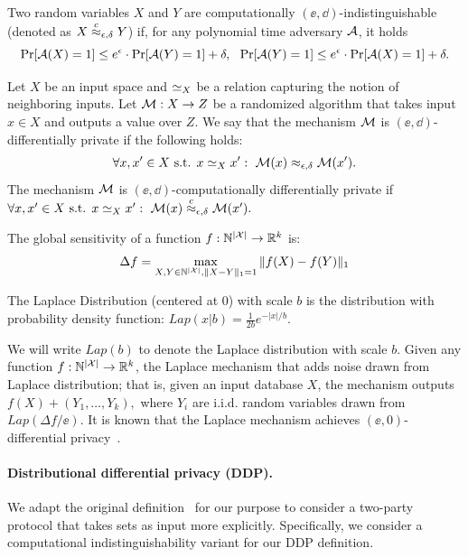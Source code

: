 \begin{definition}  
    Two random variables $X$ and $Y$ are computationally $(\ee,\dd)$-indistinguishable (denoted as $X \stackrel{c}{\approx}_{\epsilon,\delta} Y$) if, for any polynomial time adversary $\mathcal{A}$, it holds 
        \[\Pr[\mathcal{A}(X) = 1] \leq e^\epsilon \cdot \Pr[\mathcal{A}(Y) = 1] + \delta, ~~
        \Pr[\mathcal{A}(Y) = 1] \leq e^\epsilon \cdot \Pr[\mathcal{A}(X) = 1] + \delta.\]
\end{definition}

\begin{definition}
    Let $X$ be an input space and $\simeq_X$ be a relation capturing the notion of neighboring inputs. Let $\mathcal{M}: X \rightarrow Z$ be a randomized algorithm that takes input $x\in X$ and outputs a value over $Z$. We say that the mechanism $\mathcal{M}$ is $(\ee, \dd)$-differentially private if the following holds: 
   \[ \forall x, x' \in X  \mbox{ s.t. } x \simeq_X x': ~ \mathcal{M}(x) \approx_{\epsilon,\delta} \mathcal{M}(x').\]
   The mechanism $\mathcal{M}$ is $(\ee, \dd)$-computationally differentially private if 
   $\forall x, x' \in X  \mbox{ s.t. } x \simeq_X x': ~ \mathcal{M}(x) \stackrel{c}{\approx}_{\epsilon,\delta} \mathcal{M}(x').$
\end{definition}


\begin{definition}
  The global sensitivity of a function $f:\mathbb{N}^{|\mathcal{X}|} \rightarrow \mathbb{R}^k$ is:
  $$\Delta f = \max_{X, Y \in \mathbb{N}^{|\mathcal{X}|}, \Vert X - Y \Vert_1 = 1} \Vert f(X) - f(Y) \Vert_1$$
\end{definition}

\begin{definition}
The Laplace Distribution (centered at 0) with scale $b$ is the distribution
with probability density function:
$Lap(x|b) = \frac 1 {2b} e^{-|x|/b}.$
\end{definition}
%
We will write $Lap(b)$ to denote the Laplace distribution with scale $b$. 
Given any function $f:\mathbb{N}^{|\mathcal{X}|} \rightarrow \mathbb{R}^k$, the Laplace mechanism that adds
noise drawn from Laplace distribution; that is, given an input database $X$,
the mechanism outputs $f(X) + (Y_1, \ldots , Y_k),$ where $Y_i$ are i.i.d.
random variables drawn from $Lap(\Delta f/\ee)$. It is known that the Laplace
mechanism achieves $(\ee, 0)$-differential privacy~\cite[Theorem 3.6]{dwork2014algorithmic}. 


\paragraph{Distributional differential privacy (DDP).} 
We adapt the original definition~\cite{FOCS:BGKS13} for our purpose to consider a two-party protocol that takes sets as input more explicitly. Specifically, we consider a computational indistinguishability variant for our DDP definition. 


